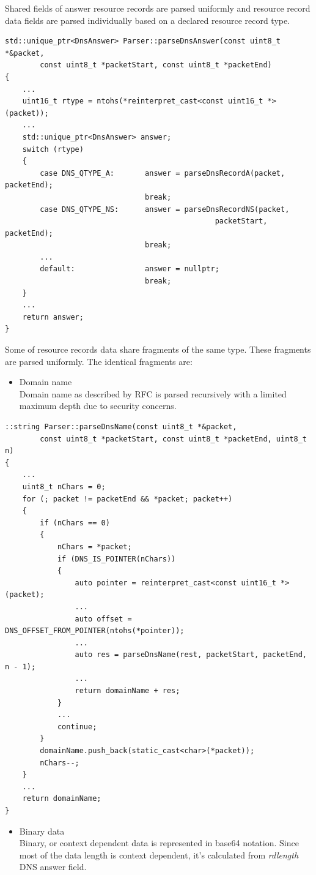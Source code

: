 \documentclass[a4paper, 12pt]{article}
\begin{document}
\newpage
Shared fields of answer resource records are parsed uniformly and resource record data fields are parsed individually based on a declared resource record type.
\begin{lstlisting}
std::unique_ptr<DnsAnswer> Parser::parseDnsAnswer(const uint8_t *&packet,
        const uint8_t *packetStart, const uint8_t *packetEnd)
{
    ...
    uint16_t rtype = ntohs(*reinterpret_cast<const uint16_t *>(packet));
    ...
    std::unique_ptr<DnsAnswer> answer;
    switch (rtype)
    {
        case DNS_QTYPE_A:       answer = parseDnsRecordA(packet, packetEnd);
                                break;
        case DNS_QTYPE_NS:      answer = parseDnsRecordNS(packet,
                                                packetStart, packetEnd);
                                break;
        ...
        default:                answer = nullptr;
                                break;
    }
    ...
    return answer;
}
\end{lstlisting}
Some of resource records data share fragments of the same type. These fragments are parsed uniformly. 
The identical fragments are:
\begin{itemize}
\item Domain name\\
Domain name as described by RFC is parsed recursively with a limited maximum depth due to security concerns.
\end{itemize}
\begin{lstlisting}
::string Parser::parseDnsName(const uint8_t *&packet,
        const uint8_t *packetStart, const uint8_t *packetEnd, uint8_t n)
{
    ...
    uint8_t nChars = 0;
    for (; packet != packetEnd && *packet; packet++)
    {
        if (nChars == 0)
        {
            nChars = *packet;
            if (DNS_IS_POINTER(nChars))
            {
                auto pointer = reinterpret_cast<const uint16_t *>(packet);
                ...
                auto offset = DNS_OFFSET_FROM_POINTER(ntohs(*pointer));
                ...
                auto res = parseDnsName(rest, packetStart, packetEnd, n - 1);
                ...
                return domainName + res;
            }
            ...
            continue;
        }
        domainName.push_back(static_cast<char>(*packet));
        nChars--;
    }
    ...
    return domainName;
}
\end{lstlisting}
\begin{itemize}
\item Binary data\\
Binary, or context dependent data is represented in base64 notation. Since most of the data length is context dependent, it's calculated from \textit{rdlength} DNS answer field.
\end{itemize}
\end{document}
